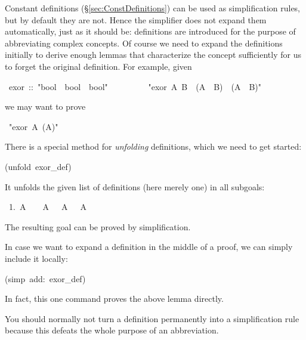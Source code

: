 \begin{isabelle}%
%
\begin{isamarkuptext}%
\noindent Constant definitions (\S\ref{sec:ConstDefinitions}) can
be used as simplification rules, but by default they are not.  Hence the
simplifier does not expand them automatically, just as it should be:
definitions are introduced for the purpose of abbreviating complex
concepts. Of course we need to expand the definitions initially to derive
enough lemmas that characterize the concept sufficiently for us to forget the
original definition. For example, given%
\end{isamarkuptext}%
~exor~::~{"}bool~{\isasymRightarrow}~bool~{\isasymRightarrow}~bool{"}\isanewline
~~~~~~~~~{"}exor~A~B~{\isasymequiv}~(A~{\isasymand}~{\isasymnot}B)~{\isasymor}~({\isasymnot}A~{\isasymand}~B){"}%
\begin{isamarkuptext}%
\noindent
we may want to prove%
\end{isamarkuptext}%
~{"}exor~A~({\isasymnot}A){"}%
\begin{isamarkuptxt}%
\noindent
There is a special method for \emph{unfolding} definitions, which we need to
get started:%
\end{isamarkuptxt}%
(unfold~exor\_def)%
\begin{isamarkuptxt}%
\noindent
It unfolds the given list of definitions (here merely one) in all subgoals:
\begin{isabellepar}%
~1.~A~{\isasymand}~{\isasymnot}~{\isasymnot}~A~{\isasymor}~{\isasymnot}~A~{\isasymand}~{\isasymnot}~A%
\end{isabellepar}%
The resulting goal can be proved by simplification.

In case we want to expand a definition in the middle of a proof, we can
simply include it locally:%
\end{isamarkuptxt}%
(simp~add:~exor\_def)%
\begin{isamarkuptext}%
\noindent
In fact, this one command proves the above lemma directly.

You should normally not turn a definition permanently into a simplification
rule because this defeats the whole purpose of an abbreviation.%
\end{isamarkuptext}%
\end{isabelle}%
